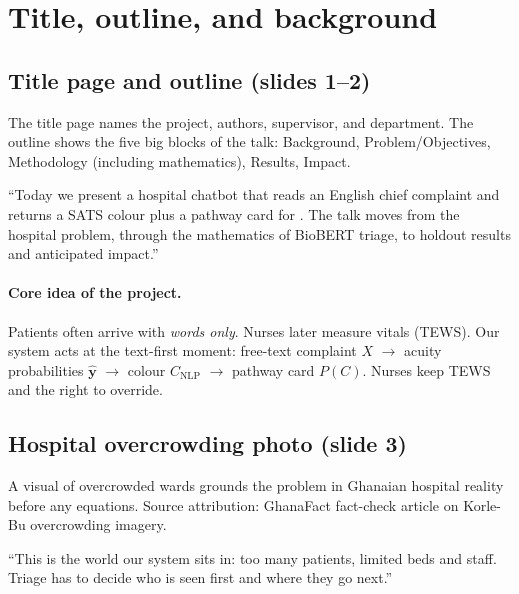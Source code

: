 \section{Title, outline, and background}
\label{sec:front}

\subsection{Title page and outline (slides 1--2)}

\begin{whybox}
The title page names the project, authors, supervisor, and department.
The outline shows the five big blocks of the talk: Background, Problem/Objectives,
Methodology (including mathematics), Results, Impact.
\end{whybox}

\begin{saybox}
``Today we present a hospital chatbot that reads an English chief complaint and returns
a SATS colour plus a pathway card for \examplehospital{}. The talk moves from the hospital
problem, through the mathematics of BioBERT triage, to holdout results and anticipated impact.''
\end{saybox}

\paragraph{Core idea of the project.}
Patients often arrive with \emph{words only}. Nurses later measure vitals (TEWS).
Our system acts at the text-first moment: free-text complaint \(X\) \(\to\) acuity probabilities
\(\hat{\mathbf{y}}\) \(\to\) colour \(C_{\mathrm{NLP}}\) \(\to\) pathway card \(P(C)\).
Nurses keep TEWS and the right to override.

\subsection{Hospital overcrowding photo (slide 3)}

\begin{whybox}
A visual of overcrowded wards grounds the problem in Ghanaian hospital reality before any equations.
Source attribution: GhanaFact fact-check article on Korle-Bu overcrowding imagery.
\end{whybox}

\begin{saybox}
``This is the world our system sits in: too many patients, limited beds and staff.
Triage has to decide who is seen first and where they go next.''
\end{saybox}

